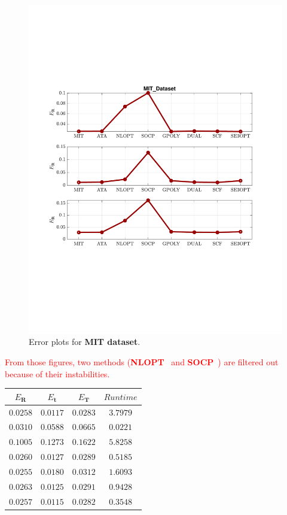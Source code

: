 \begin{figure}
\centering
\includegraphics[scale=0.7]{./hand_eye_figures/real/adv_Result_MIT_Dataset}
\caption{Error plots for \textbf{MIT dataset}.}
\end{figure}

\textcolor{red}{
From those figures, two methods (\textbf{NLOPT}~\cite{horaud1995hand} and \textbf{SOCP}~\cite{zhao2011hand}) are filtered out because of their instabilities. } 

\begin{table}
\centering
\begin{tabular}{c|c|c|c}
$E_{\mathbf{R}}$ & $E_{\mathbf{t}}$ & $E_{\mathbf{T}}$ & $Runtime$\\ \hline
    $0.0258$ &   $0.0117$  &  $0.0283$ &  $3.7979$ \\ \hline
    $0.0310$ &   $0.0588$  &  $0.0665$ &  $0.0221$ \\ \hline
    $0.1005$ &   $0.1273$  &  $0.1622$ &  $5.8258$ \\ \hline
    $0.0260$ &   $0.0127$  &  $0.0289$ &  $0.5185$ \\ \hline
    $0.0255$ &   $0.0180$  &  $0.0312$ &  $1.6093$ \\ \hline
    $0.0263$ &   $0.0125$  &  $0.0291$ &  $0.9428$ \\ \hline
    $0.0257$ &   $0.0115$  &  $0.0282$ &  $0.3548$ \\ \hline                     
\hline
\end{tabular}
\end{table}